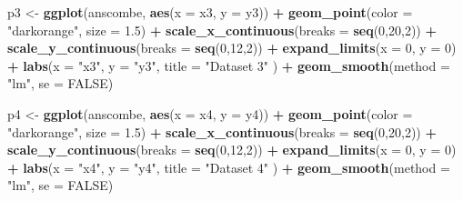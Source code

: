 \documentclass[
	12pt,				%
	oneside,			%
	a4paper,			%
	chapter=TITLE,		%
	section=TITLE,		%
	english,			%
	brazil				%
	]{abntex2}
\newenvironment{Shaded}{\begin{snugshade}}{\end{snugshade}}
\newcommand{\AttributeTok}[1]{\textcolor[rgb]{0.13,0.29,0.53}{#1}}
\newcommand{\ConstantTok}[1]{\textcolor[rgb]{0.56,0.35,0.01}{#1}}
\newcommand{\DecValTok}[1]{\textcolor[rgb]{0.00,0.00,0.81}{#1}}
\newcommand{\FloatTok}[1]{\textcolor[rgb]{0.00,0.00,0.81}{#1}}
\newcommand{\FunctionTok}[1]{\textcolor[rgb]{0.13,0.29,0.53}{\textbf{#1}}}
\newcommand{\NormalTok}[1]{#1}
\newcommand{\OtherTok}[1]{\textcolor[rgb]{0.56,0.35,0.01}{#1}}
\newcommand{\SpecialCharTok}[1]{\textcolor[rgb]{0.81,0.36,0.00}{\textbf{#1}}}
\newcommand{\StringTok}[1]{\textcolor[rgb]{0.31,0.60,0.02}{#1}}
\begin{document}
\begin{Shaded}
\begin{Highlighting}[]
\NormalTok{p3 }\OtherTok{\textless{}{-}} \FunctionTok{ggplot}\NormalTok{(anscombe, }\FunctionTok{aes}\NormalTok{(}\AttributeTok{x =}\NormalTok{ x3, }\AttributeTok{y =}\NormalTok{ y3)) }\SpecialCharTok{+}
  \FunctionTok{geom\_point}\NormalTok{(}\AttributeTok{color =} \StringTok{"darkorange"}\NormalTok{, }\AttributeTok{size =} \FloatTok{1.5}\NormalTok{) }\SpecialCharTok{+}
  \FunctionTok{scale\_x\_continuous}\NormalTok{(}\AttributeTok{breaks =} \FunctionTok{seq}\NormalTok{(}\DecValTok{0}\NormalTok{,}\DecValTok{20}\NormalTok{,}\DecValTok{2}\NormalTok{)) }\SpecialCharTok{+}
  \FunctionTok{scale\_y\_continuous}\NormalTok{(}\AttributeTok{breaks =} \FunctionTok{seq}\NormalTok{(}\DecValTok{0}\NormalTok{,}\DecValTok{12}\NormalTok{,}\DecValTok{2}\NormalTok{)) }\SpecialCharTok{+}
  \FunctionTok{expand\_limits}\NormalTok{(}\AttributeTok{x =} \DecValTok{0}\NormalTok{, }\AttributeTok{y =} \DecValTok{0}\NormalTok{) }\SpecialCharTok{+}
  \FunctionTok{labs}\NormalTok{(}\AttributeTok{x =} \StringTok{"x3"}\NormalTok{, }\AttributeTok{y =} \StringTok{"y3"}\NormalTok{,}
       \AttributeTok{title =} \StringTok{"Dataset 3"}\NormalTok{ ) }\SpecialCharTok{+}
  \FunctionTok{geom\_smooth}\NormalTok{(}\AttributeTok{method =} \StringTok{"lm"}\NormalTok{, }\AttributeTok{se =} \ConstantTok{FALSE}\NormalTok{)}

\NormalTok{p4 }\OtherTok{\textless{}{-}} \FunctionTok{ggplot}\NormalTok{(anscombe, }\FunctionTok{aes}\NormalTok{(}\AttributeTok{x =}\NormalTok{ x4, }\AttributeTok{y =}\NormalTok{ y4)) }\SpecialCharTok{+}
  \FunctionTok{geom\_point}\NormalTok{(}\AttributeTok{color =} \StringTok{"darkorange"}\NormalTok{, }\AttributeTok{size =} \FloatTok{1.5}\NormalTok{) }\SpecialCharTok{+}
  \FunctionTok{scale\_x\_continuous}\NormalTok{(}\AttributeTok{breaks =} \FunctionTok{seq}\NormalTok{(}\DecValTok{0}\NormalTok{,}\DecValTok{20}\NormalTok{,}\DecValTok{2}\NormalTok{)) }\SpecialCharTok{+}
  \FunctionTok{scale\_y\_continuous}\NormalTok{(}\AttributeTok{breaks =} \FunctionTok{seq}\NormalTok{(}\DecValTok{0}\NormalTok{,}\DecValTok{12}\NormalTok{,}\DecValTok{2}\NormalTok{)) }\SpecialCharTok{+}
  \FunctionTok{expand\_limits}\NormalTok{(}\AttributeTok{x =} \DecValTok{0}\NormalTok{, }\AttributeTok{y =} \DecValTok{0}\NormalTok{) }\SpecialCharTok{+}
  \FunctionTok{labs}\NormalTok{(}\AttributeTok{x =} \StringTok{"x4"}\NormalTok{, }\AttributeTok{y =} \StringTok{"y4"}\NormalTok{,}
       \AttributeTok{title =} \StringTok{"Dataset 4"}\NormalTok{ ) }\SpecialCharTok{+}
  \FunctionTok{geom\_smooth}\NormalTok{(}\AttributeTok{method =} \StringTok{"lm"}\NormalTok{, }\AttributeTok{se =} \ConstantTok{FALSE}\NormalTok{)}
\end{Highlighting}
\end{Shaded}
\end{document}
